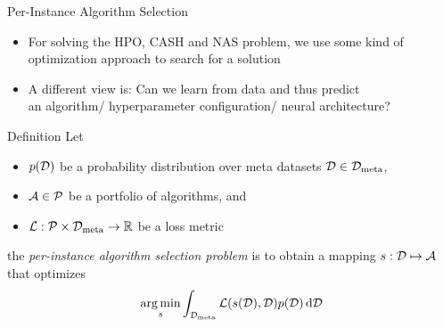 \begin{frame}[c]{Per-Instance Algorithm Selection}

\begin{itemize}
	\item For solving the HPO, CASH and NAS problem, we use some kind of optimization approach to \alert{search} for a solution
	\pause
	\item A different view is: Can we learn from data and thus \alert{predict}\\ an algorithm/ hyperparameter configuration/ neural architecture?
\end{itemize}

\pause
\begin{block}{Definition}
	Let 
	\begin{itemize}
		\item $p(\mathcal{D})$ be a probability \alert{distribution} over meta datasets $\mathcal{D} \in \mathcal{D}_{\text{meta}}$,
		\pause
		\item $\mathcal{A} \in \mathcal{P}$ be a portfolio of algorithms, and
		\pause
		\item $\mathcal{L}: \mathcal{P} \times \mathcal{D}_{\text{meta}} \rightarrow \mathbb{R}$ be a loss metric   
	\end{itemize}
	
	\pause
	the \emph{per-instance algorithm selection problem} is to obtain a mapping 
	$s: \mathcal{D} \mapsto \mathcal{A}$ 
	that optimizes 
	$$\operatorname*{arg\,min}_{s} \int_{\mathcal{D}_{\text{meta}}} \mathcal{L}(s(\mathcal{D}),\mathcal{D}) p(\mathcal{D}) \mathop{}\!\mathrm{d}\mathcal{D}$$
\end{block}

\end{frame}
